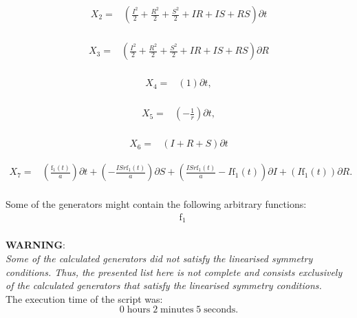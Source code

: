 \begin{align*}
X_{2}=&\left(\frac{I^{2}}{2}+\frac{R^{2}}{2}+\frac{S^{2}}{2}+I R+I S+R S \right)\partial t\\
\end{align*}

\begin{align*}
X_{3}=&\left(\frac{I^{2}}{2}+\frac{R^{2}}{2}+\frac{S^{2}}{2}+I R+I S+R S \right)\partial R\\
\end{align*}

\begin{align*}
X_{4}=&\left(1 \right)\partial t,\\
\end{align*}

\begin{align*}
X_{5}=&\left(- \frac{1}{r} \right)\partial t,\\
\end{align*}

\begin{align*}
X_{6}=&\left(I+R+S \right)\partial t
\end{align*}

\begin{align*}
X_{7}=&\left(\frac{\operatorname{f_{1}}{\left(t \right)}}{a} \right)\partial t+\left(- \frac{I S r \operatorname{f_{1}}{\left(t \right)}}{a} \right)\partial S+\left(\frac{I S r \operatorname{f_{1}}{\left(t \right)}}{a} - I \operatorname{f_{1}}{\left(t \right)} \right)\partial I+\left(I \operatorname{f_{1}}{\left(t \right)} \right)\partial R.\\
\end{align*}



\noindent Some of the generators might contain the following arbitrary functions:
\begin{align*}
&\operatorname{f_{1}}\\
\end{align*}

\noindent\huge\textbf{WARNING}:\\
\noindent\Large\textit{Some of the calculated generators did not satisfy the linearised symmetry conditions. Thus, the presented list here is not complete and consists exclusively of the calculated generators that satisfy the linearised symmetry conditions.}\normalsize\\[2cm]
\noindent The execution time of the script was:
$$0\;\mathrm{hours}\;2\;\mathrm{minutes}\;5 \;\mathrm{seconds}.$$

